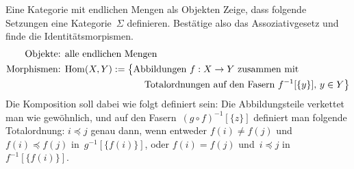 \documentclass{uebblatt}
\begin{document}
\begin{aufgabe}{Eine Kategorie mit endlichen Mengen als Objekten}
Zeige, dass folgende Setzungen eine Kategorie~$\Sigma$ definieren. Bestätige
also das Assoziativgesetz und finde die Identitätsmorpismen.
\begin{align*}
  \text{Objekte: } & \text{alle endlichen Mengen} \\
  \text{Morphismen: } &
    \mathrm{Hom}(X,Y) := \bigl\{
      \text{Abbildungen~$f : X \to Y$ zusammen mit} \\
    & \qquad\qquad\qquad\qquad \text{
      Totalordnungen auf den Fasern~$f^{-1}[\{y\}]$, $y \in Y$} \bigr\}
\end{align*}
Die Komposition soll dabei wie folgt definiert sein: Die Abbildungsteile
verkettet man wie gewöhnlich, und auf den Fasern~$(g \circ f)^{-1}[\{z\}]$
definiert man folgende Totalordnung: $i \preceq j$ genau dann, wenn entweder
$f(i) \neq f(j)$ und~$f(i) \preceq f(j)$ in~$g^{-1}[\{f(i)\}]$, oder $f(i) =
f(j)$ und~$i \preceq j$ in~$f^{-1}[\{f(i)\}]$.
\end{aufgabe}
\end{document}
